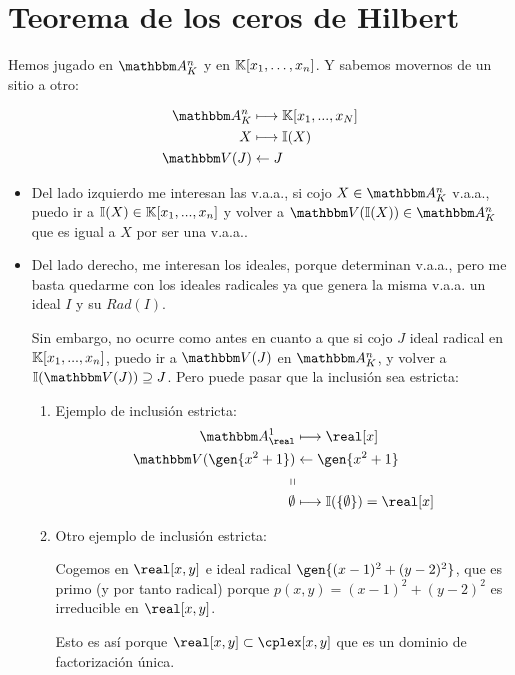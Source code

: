 \chapter{Teorema de los ceros de Hilbert}

Hemos jugado en $\Akn$ y en $\mathbb{K}[x_1,\dotsc,x_n]$. Y sabemos movernos de un sitio a otro:

\begin{align*}
	\Akn & \longmapsto  \K[x_1,...,x_N] \\
	X & \longmapsto  \I(X) \\
	\V(J) & \leftarrow  J \\
\end{align*}

\begin{itemize}
	\item Del lado izquierdo me interesan las v.a.a., si cojo $X\in \Akn$ v.a.a., puedo ir a $\mathbb{I}(X) \in \mathbb{K}[x_1,...,x_n]$ y volver a $\V(\I(X)) \in \Akn$ que es igual a $X$ por ser una v.a.a..

	\item Del lado derecho, me interesan los ideales, porque determinan v.a.a., pero me basta quedarme con los ideales radicales ya que genera la misma v.a.a. un ideal $I$ y su $Rad(I)$. 
	
	Sin embargo, no ocurre como antes en cuanto a que si cojo $J$ ideal radical en $\mathbb{K}[x_1,...,x_n]$, puedo ir a $\V(J)$ en $\Akn$, y volver a $\I(\V(J)) \supseteq J$. Pero puede pasar que la inclusión sea estricta:
	\begin{example}
		\begin{enumerate}
			\item Ejemplo de inclusión estricta:
			\begin{align*}
				\A^1_{\real} & \longmapsto  \real[x] \\
				\V(\gen{x^2+1}) & \leftarrow  \gen{x^2+1} \\
				\shortparallel & \\
				\emptyset & \longmapsto  \I(\{ \emptyset \})=\real[x] \\
			\end{align*}
			\item Otro ejemplo de inclusión estricta:

			Cogemos en $\real[x,y]$ e ideal  radical $\gen{(x-1)^2+(y-2)^2}$, que es primo (y por tanto radical) porque $p(x,y)=(x-1)^2+(y-2)^2$ es irreducible en $\real[x,y]$.

			Esto es así porque $\real[x,y] \subset \cplex[x,y]$  que es un dominio de factorización única.


\end{enumerate}
\end{example}
\end{itemize}
